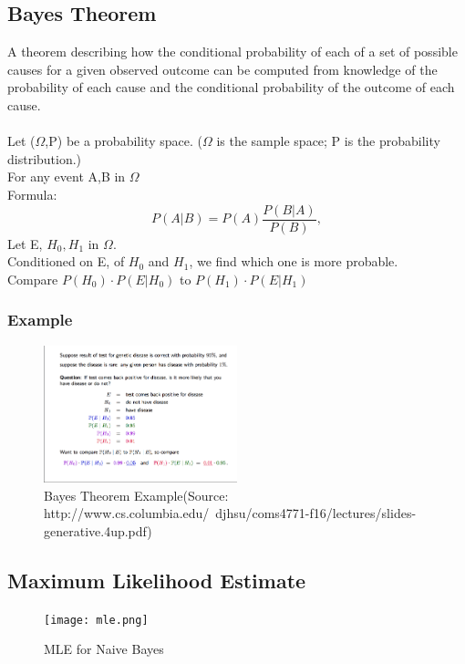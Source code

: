 \subsection{Bayes Theorem} A theorem describing how the conditional probability of each of a set of possible causes for a given observed outcome can be computed from knowledge of the probability of each cause and the conditional probability of the outcome of each cause.\\
\\Let ($\Omega$,P) be a probability space. ($\Omega$ is the sample space; P is the probability distribution.)
\\For any event A,B in $\Omega$
\\Formula: 
\begin{equation}
P(A|{B}) = P(A ) \frac{P({B} |A)}{P({B})},
\end{equation}
Let E, $H_0, H_1 $ in  $\Omega$. \\Conditioned on E, of $H_0$ and $H_1$, we find which one is more probable.
\\Compare $P(H_0) \cdot P(E | H_0)$ to $P(H_1) \cdot P(E | H_1)$
\subsubsection{Example}
\begin{figure}[H]
  \begin{center}
    \includegraphics[width=0.5\textwidth]{disease.png}
    \caption{
      Bayes Theorem Example(Source: http://www.cs.columbia.edu/~djhsu/coms4771-f16/lectures/slides-generative.4up.pdf)}
  \end{center}
\end{figure}


\subsection{Maximum Likelihood Estimate}
\begin{figure}[H]
  \begin{center}
    \texttt{[image: mle.png]}
    \caption{
      MLE for Naive Bayes}
  \end{center}
\end{figure}


